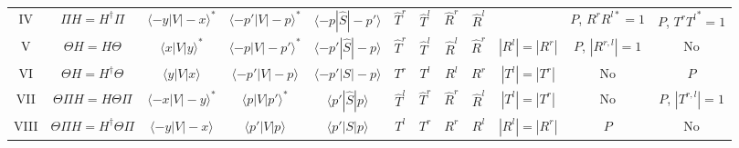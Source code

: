 \begin{landscape}
\begin{table}
{\begin{tabular}{cccccccccccc}
      IV & $\Pi H=H^\dagger \Pi$ &  $\langle -y|V|-x\rangle^*$ & $\langle -p'|V|-p\rangle^*$ & $\langle -p|\widehat{S}|-p'\rangle$ & $\widehat{T}^r$ & $\widehat{T}^l$ & $\widehat{R}^r$ & $\widehat{R}^l$&&$P$, $R^rR^{l*}=1$&$P$, $T^r{T^l}^*=1$
      \\
      V & $\Theta H=H\Theta$ &  $\langle x|V|y\rangle^*$& $\langle -p|V|-p'\rangle^*$ & $\langle -p'|\widehat{S}|-p\rangle$ & $\widehat{T}^r$ & $\widehat{T}^l$ & $\widehat{R}^l$& $\widehat{R}^r$
      &$|R^l|=|R^r|$&$P$, $|R^{r,l}|=1$&No
      \\
      VI & $\Theta H=H^\dagger\Theta$ &  $\langle y|V|x\rangle$& $\langle -p'|V|-p\rangle$ & $\langle -p'|S|-p\rangle$ & $T^r$& $T^l$ & $R^l$& $R^r$&$|T^l| = |T^r|$&No&$P$
      \\
      VII & $\Theta\Pi H=H\Theta \Pi$ &  $\langle -x|V|-y\rangle^*$ & $\langle p|V|p'\rangle^*$ & $\langle p'|\widehat{S}|p\rangle$ &$\widehat{T}^l$& $\widehat{T}^r$ & $\widehat{R}^r$& $\widehat{R}^l$&$|T^l|=|T^r|$&No&$P$, $|T^{r,l}|=1$
      \\
      VIII& $\Theta\Pi H=H^\dagger \Theta \Pi$ &  $\langle -y|V|-x\rangle$ & $\langle p'|V|p\rangle$ & $\langle p'|S|p\rangle$ & $T^l$ & $T^r$ & $R^r$ & $R^l$&$|R^l|=|R^r|$&$P$&No
    \end{tabular}}
  \end{table}
\end{landscape}



